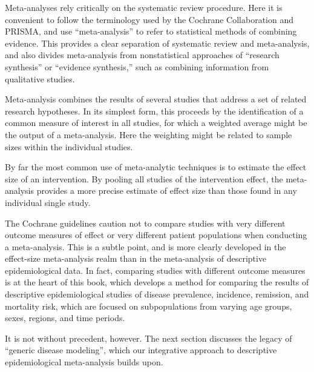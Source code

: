 Meta-analyses rely critically on the systematic review procedure. Here
it is convenient to follow the terminology used by the Cochrane
Collaboration and PRISMA, and use ``meta-analysis'' to refer to
statistical methods of combining evidence.  This provides a clear
separation of systematic review and meta-analysis, and also divides
meta-analysis from nonstatistical approaches of ``research
synthesis'' or ``evidence synthesis,'' such as combining information
from qualitative studies.

Meta-analysis combines the results of several studies that address a
set of related research hypotheses. In its simplest form, this
proceeds by the identification of a common measure of interest in all studies, for
which a weighted average might be the output of a meta-analysis. Here
the weighting might be related to sample sizes within the individual
studies.

By far the most common use of meta-analytic techniques is to estimate
the effect size of an intervention.  By pooling all studies of the
intervention effect, the meta-analysis provides a more precise
estimate of effect size than those found in any individual single
study.

The Cochrane guidelines caution not to compare studies with very
different outcome measures of effect or very different patient
populations when conducting a
meta-analysis.\cite{Cochrane_Cochrane_2012} This is a subtle point,
and is more clearly developed in the effect-size meta-analysis realm
than in the meta-analysis of descriptive epidemiological data.  In
fact, comparing studies with different outcome measures is at the
heart of this book, which develops a method for comparing the results
of descriptive epidemiological studies of disease prevalence,
incidence, remission, and mortality risk, which are focused on
subpopulations from varying age groups, sexes, regions, and time
periods.

It is not without precedent, however.  The next section discusses the
legacy of ``generic disease modeling'', which our integrative approach
to descriptive epidemiological meta-analysis builds upon.



